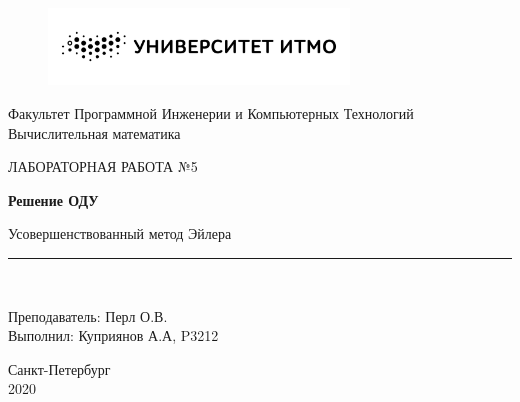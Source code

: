 \documentclass[11pt, english]{article}
\begin{document}
\begin{titlepage}

\begin{center}
\vspace*{-1in}
\begin{figure}[htb]
\begin{center}
\includegraphics[width=8cm]{bw_w_rus.png}
\end{center}
\end{figure}

Факультет Программной Инженерии и Компьютерных Технологий \\
\vspace*{0.15in}
Вычислительная математика \\
\vspace*{0.4in}
\begin{large}
ЛАБОРАТОРНАЯ РАБОТА №5\\
\end{large}
\vspace*{0.2in}
\begin{Large}
\textbf{Решение ОДУ} \\
\end{Large}
\vspace*{0.3in}
\begin{large}
Усовершенствованный метод Эйлера \\
\end{large}
\vspace*{0.3in}
\rule{80mm}{0.1mm}\\
\vspace*{0.1in}
\begin{large}
Преподаватель: Перл О.В. \\
Выполнил: Куприянов А.А, P3212 \\
\end{large}
\vspace*{3.6in}

Санкт-Петербург \\
2020
\end{center}
\end{titlepage}

\newcommand{\CC}{C\nolinebreak\hspace{-.05em}\raisebox{.4ex}{\tiny\bf +}\nolinebreak\hspace{-.10em}\raisebox{.4ex}{\tiny\bf +}}
\def\CC{{C\nolinebreak[4]\hspace{-.05em}\raisebox{.4ex}{\tiny\bf ++}}}
\end{document}
